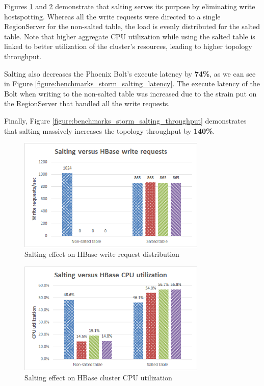 Figures \ref{figure:benchmarks_storm_salting_requests} and \ref{figure:benchmarks_storm_salting_cpu} demonstrate that salting serves its purpose by eliminating write hostspotting. Whereas all the write requests were directed to a single RegionServer for the non-salted table, the load is evenly distributed for the salted table. Note that higher aggregate CPU utilization while using the salted table is linked to better utilization of the cluster's resources, leading to higher topology throughput.

Salting also decreases the Phoenix Bolt's execute latency by \textbf{74\%}, as we can see in Figure \ref{figure:benchmarks_storm_salting_latency}. The execute latency of the Bolt when writing to the non-salted table was increased due to the strain put on the RegionServer that handled all the write requests.

Finally, Figure \ref{figure:benchmarks_storm_salting_throughput} demonstrates that salting massively increases the topology throughput by \textbf{140\%}.

\begin{figure}[H]
\centering
\includegraphics[width=0.8\textwidth]{figures/benchmarks_storm_salting_requests}
\caption{Salting effect on HBase write request distribution}
\label{figure:benchmarks_storm_salting_requests}
\end{figure}

\begin{figure}[H]
\centering
\includegraphics[width=0.8\textwidth]{figures/benchmarks_storm_salting_cpu}
\caption{Salting effect on HBase cluster CPU utilization}
\label{figure:benchmarks_storm_salting_cpu}
\end{figure}

